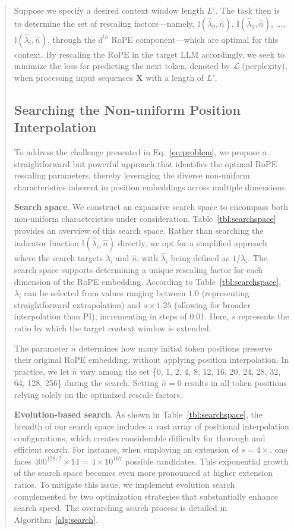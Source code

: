 \begin{abstract}
Suppose we specify a desired context window length $L'$. The task then is to determine the set of rescaling factors—namely, $\mathbb{I}(\hat{\lambda}_{0},\hat{n})$, $\mathbb{I}(\hat{\lambda}_{1},\hat{n})$, $\ldots$, $\mathbb{I}(\hat{\lambda}_{i},\hat{n})$, through the $d^{th}$ RoPE component—which are optimal for this context. By rescaling the $\text{RoPE}$ in the target $\text{LLM}$ accordingly, we seek to minimize the loss for predicting the next token, denoted by $\mathcal{L}$ (perplexity), when processing input sequences $\mathbf{X}$ with a length of $L'$.

\subsection{Searching the Non-uniform Position Interpolation}

To address the challenge presented in Eq.~\ref{eq:problem}, we propose a straightforward but powerful approach that identifies the optimal RoPE rescaling parameters, thereby leveraging the diverse non-uniform characteristics inherent in position embeddings across multiple dimensions.

\textbf{Search space}. We construct an expansive search space to encompass both non-uniform characteristics under consideration. Table~\ref{tbl:searchspace} provides an overview of this search space. Rather than searching the indicator function $\mathbb{I}(\hat{\lambda}_{i},\hat{n})$ directly, we opt for a simplified approach where the search targets $\lambda_i$ and $\hat{n}$, with $\hat{\lambda}_{i}$ being defined as $1/\lambda_i$. The search space supports determining a unique rescaling factor for each dimension of the RoPE embedding. According to Table~\ref{tbl:searchspace}, $\lambda_i$ can be selected from values ranging between 1.0 (representing straightforward extrapolation) and $s\times1.25$ (allowing for broader interpolation than PI), incrementing in steps of 0.01. Here, $s$ represents the ratio by which the target context window is extended.

The parameter $\hat{n}$ determines how many initial token positions preserve their original RoPE embedding, without applying position interpolation. In practice, we let $\hat{n}$ vary among the set \{0, 1, 2, 4, 8, 12, 16, 20, 24, 28, 32, 64, 128, 256\} during the search. Setting $\hat{n}=0$ results in all token positions relying solely on the optimized rescale factors.

\textbf{Evolution-based search}. As shown in Table~\ref{tbl:searchspace}, the breadth of our search space includes a vast array of positional interpolation configurations, which creates considerable difficulty for thorough and efficient search. For instance, when employing an extension of $s=4\times$, one faces $400^{128/2}\times14$ = $4\times10^{167}$ possible candidates. This exponential growth of the search space becomes even more pronounced at higher extension ratios. To mitigate this issue, we implement evolution search~\cite{guo2020single} complemented by two optimization strategies that substantially enhance search speed. The overarching search process is detailed in Algorithm~\ref{alg:search}.


\end{abstract}
